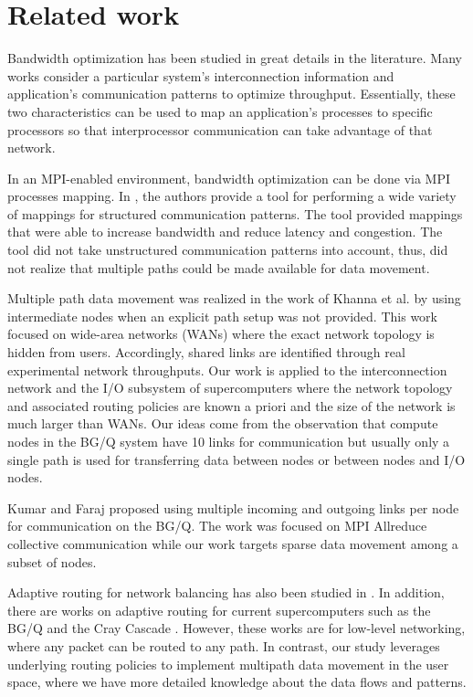 \section{Related work}
\label{sec:relatedwork}

Bandwidth optimization has been studied in great details in the literature. Many works consider a particular system's interconnection information and application's communication patterns to optimize throughput. Essentially, these two characteristics can be used to map an application's processes to specific processors so that interprocessor communication can take advantage of that network.

In an MPI-enabled environment, bandwidth optimization can be done via MPI processes mapping. In \cite{Bhatele:mapping}, the authors provide a tool for performing a wide variety of mappings for structured communication patterns. The tool provided mappings that were able to increase bandwidth and reduce latency and congestion. The tool did not take unstructured communication patterns into account, thus, did not realize that multiple paths could be made available for data movement.

Multiple path data movement was realized in the work of Khanna et al. \cite{Proxies:Gaurav} by using intermediate nodes when an explicit path setup was not provided. This work focused on wide-area networks (WANs) where the exact network topology is hidden from users. Accordingly, shared links are identified through real experimental network throughputs. Our work is applied to the interconnection network and the I/O subsystem of supercomputers where the network topology and associated routing policies are known a priori and the size of the network is much larger than WANs. Our ideas come from the observation that compute nodes in the BG/Q system have 10 links for communication but usually only a single path is used for transferring data between nodes or between nodes and I/O nodes.

Kumar and Faraj \cite{Kumar:Allreduce} proposed using multiple incoming and outgoing links per node for communication on the BG/Q. The work was focused on MPI Allreduce collective communication while our work targets sparse data movement among a subset of nodes.

Adaptive routing for network balancing has also been studied in \cite{Valiant:Routing,singh2003:goal}. In addition, there are works on adaptive routing for current supercomputers such as the BG/Q \cite{Chen:BGQ} and the Cray Cascade \cite{garcia2013:CrayDragonfly}. However, these works are for low-level networking, where any packet can be routed to any path. In contrast, our study leverages underlying routing policies to implement multipath data movement in the user space, where we have more detailed knowledge about the data flows and patterns.


